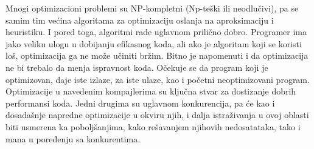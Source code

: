 \documentclass[a4paper]{article}
\begin{document}
Mnogi optimizacioni problemi su NP-kompletni (Np-teški ili neodlučivi), pa se samim tim većina algoritama za optimizaciju oslanja na aproksimaciju i heuristiku.  
I pored toga, algoritmi rade uglavnom prilično dobro. 
Programer ima jako veliku ulogu u dobijanju efikasnog koda, ali ako je algoritam koji se koristi loš, optimizacija ga ne može učiniti bržim. 
Bitno je napomenuti i da optimizacija ne bi trebalo da menja ispravnost koda. 
Očekuje se da program koji je optimizovan, daje iste izlaze, za iste ulaze, kao i početni neoptimizovani program.
Optimizacije u navedenim kompajlerima su ključna stvar za dostizanje dobrih performansi koda. 
Jedni drugima su uglavnom konkurencija, pa će kao i dosadašnje napredne optimizacije u okviru njih, i dalja istraživanja u ovoj 
oblasti biti usmerena ka poboljšanjima, kako rešavanjem njihovih nedosatataka, tako i mana u poređenju sa konkurentima.


\appendix
 

\end{document}
